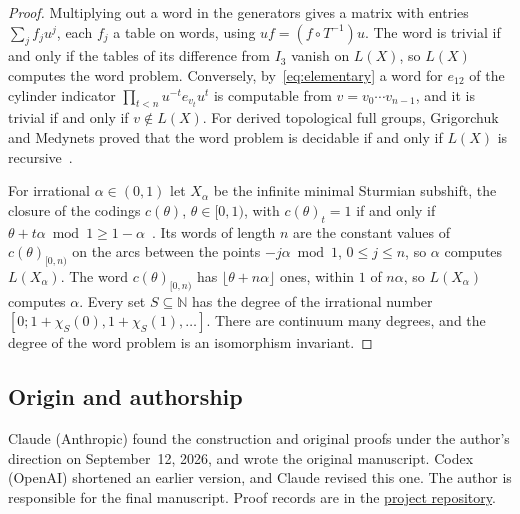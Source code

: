 \documentclass[11pt]{amsart}
\begin{document}
\begin{proof}
Multiplying out a word in the generators gives a matrix with entries
$\sum_jf_ju^j$, each $f_j$ a table on words, using $uf=(f\circ T^{-1})u$.
The word is trivial if and only if the tables of its difference from
$I_3$ vanish on $L(X)$, so $L(X)$ computes the word problem. Conversely,
by~\eqref{eq:elementary} a word for $e_{12}$ of the cylinder indicator
$\prod_{t<n}u^{-t}e_{v_t}u^t$ is computable from $v=v_0\cdots v_{n-1}$,
and it is trivial if and only if $v\notin L(X)$. For derived topological
full groups, Grigorchuk and Medynets proved that the word problem is
decidable if and only if $L(X)$ is recursive~\cite[Theorem~1.1(3)]{GMpres}.

For irrational $\alpha\in(0,1)$ let $X_\alpha$ be the infinite minimal
Sturmian subshift, the closure of the codings $c(\theta)$,
$\theta\in[0,1)$, with $c(\theta)_t=1$ if and only if
$\theta+t\alpha\bmod1\ge1-\alpha$~\cite{MorseHedlund}. Its words of
length $n$ are the constant values of $c(\theta)_{[0,n)}$ on the arcs
between the points $-j\alpha\bmod1$, $0\le j\le n$, so $\alpha$ computes
$L(X_\alpha)$. The word $c(\theta)_{[0,n)}$ has
$\lfloor\theta+n\alpha\rfloor$ ones, within $1$ of $n\alpha$, so
$L(X_\alpha)$ computes $\alpha$. Every set $S\subseteq\mathbb N$ has the
degree of the irrational number $[0;1+\chi_S(0),1+\chi_S(1),\dots]$.
There are continuum many degrees, and the degree of the word problem is
an isomorphism invariant.
\end{proof}

\subsection*{Origin and authorship}
Claude (Anthropic) found the construction and original proofs under
the author's direction on September~12, 2026, and wrote the original
manuscript. Codex (OpenAI) shortened an earlier version, and Claude
revised this one.
The author is responsible for the final manuscript. Proof records are
in the \href{https://github.com/SauersML/group-approximation}{project repository}.
\end{document}
